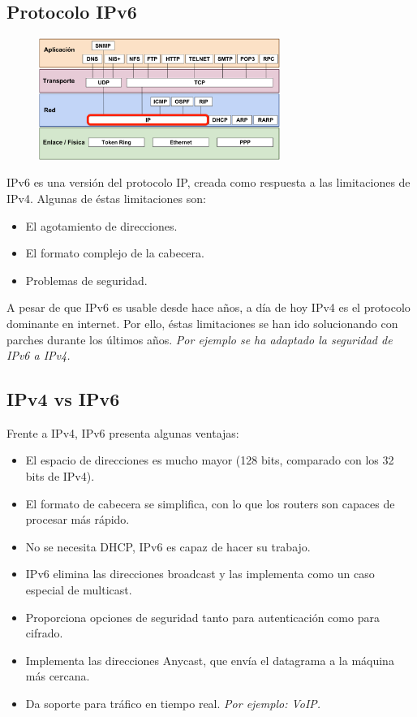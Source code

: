 \begin{onepage}
\section{Protocolo IPv6}
\begin{figure}[H]
    \centering \includegraphics[width=0.7\textwidth]{img/IP.png}
\end{figure}
IPv6 es una versión del protocolo IP, creada como respuesta a las limitaciones de IPv4. Algunas de éstas limitaciones son:
\begin{itemize}
    \item El agotamiento de direcciones.
    \item El formato complejo de la cabecera.
    \item Problemas de seguridad.
\end{itemize}
A pesar de que IPv6 es usable desde hace años, a día de hoy IPv4 es el protocolo dominante en internet. Por ello, éstas limitaciones se han ido solucionando con parches durante los últimos años. \textit{Por ejemplo se ha adaptado la seguridad de IPv6 a IPv4.}
\subsection{IPv4 vs IPv6}
Frente a IPv4, IPv6 presenta algunas ventajas:
\begin{itemize}
    \item El espacio de direcciones es mucho mayor (128 bits, comparado con los 32 bits de IPv4).
    \item El formato de cabecera se simplifica, con lo que los routers son capaces de procesar más rápido.
    \item No se necesita DHCP, IPv6 es capaz de hacer su trabajo.
    \item IPv6 elimina las direcciones broadcast y las implementa como un caso especial de multicast.
    \item Proporciona opciones de seguridad tanto para autenticación como para cifrado.
    \item Implementa las direcciones Anycast, que envía el datagrama a la máquina más cercana.
    \item Da soporte para tráfico en tiempo real. \textit{Por ejemplo: VoIP.}
\end{itemize}
\end{onepage}

